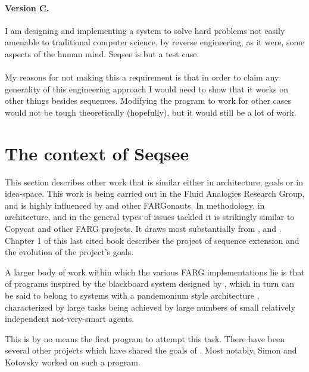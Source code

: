 \documentclass{article}
\begin{document}
\paragraph{Version C.}  I am designing and implementing a system to solve hard problems not easily amenable to traditional computer science, by reverse engineering, as it were, some aspects of the human mind.  Seqsee is but a test case.

\paragraph{} My reasons for not making this a requirement is that in order to claim any generality of this engineering approach I would need to show that it works on other things besides sequences.  Modifying the program to work for other cases would not be tough theoretically (hopefully), but it would still be a lot of work.

\tableofcontents

\section{The context of Seqsee}
\label{sec:context}

This section describes other work that is similar either in architecture, goals or in idea-space. This work is being carried out in the Fluid Analogies Research Group, and is highly influenced by \hof and other FARGonauts. In methodology, in architecture, and in the general types of issues tackled it is strikingly similar to Copycat and other FARG projects. It draws most substantially from ,  and . Chapter 1 of this last cited book describes the project of sequence extension and the evolution of the project's goals.

A larger body of work within which the various FARG implementations lie is that of programs inspired by the blackboard system designed by , which in turn can be said to belong to systems with a pandemonium style architecture \cite{Dennett:Consciousness}, characterized by large tasks being achieved by large numbers of small relatively independent not-very-smart agents. 

This is by no means the first program to attempt this task. There have been several other projects which have shared the  goals of \seq. Most notably, Simon and Kotovsky worked on such a program. 
\end{document}

